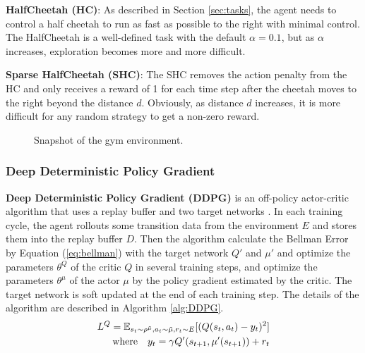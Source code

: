 \textbf{HalfCheetah (HC)}: As described in Section \ref{sec:tasks}, the agent needs to control a half cheetah to run as fast as possible to the right with minimal control. The HalfCheetah is a well-defined task with the default $\alpha = 0.1$, but as $\alpha$ increases, exploration becomes more and more difficult.

\textbf{Sparse HalfCheetah (SHC)}: The SHC removes the action penalty from the HC and only receives a reward of 1 for each time step after the cheetah moves to the right beyond the distance $d$. Obviously, as distance $d$ increases, it is more difficult for any random strategy to get a non-zero reward.

\begin{figure}[htb]
   \centering  
   \caption{Snapshot of the gym environment.}
   \label{fig:MC}
\end{figure}

\subsubsection{Deep Deterministic Policy Gradient}
\textbf{Deep Deterministic Policy Gradient (DDPG)} is an off-policy actor-critic algorithm that uses a replay buffer and two target networks \cite{DDPG}. In each training cycle, the agent rollouts some transition data from the environment $E$ and stores them into the replay buffer $D$. Then the algorithm calculate the Bellman Error by Equation (\ref{eq:bellman}) with the target network $Q'$ and $\mu'$ and optimize the parameters $\theta^{Q}$ of the critic $Q$ in several training steps, and optimize the parameters $\theta^{\mu}$ of the actor $\mu$ by the policy gradient estimated by the critic. The target network is soft updated at the end of each training step. The details of the algorithm are described in Algorithm \ref{alg:DDPG}.
\begin{equation}
   \label{eq:bellman} 
   \begin{aligned}
   L^Q=\mathbb{E}_{s_t\sim\rho^{\tilde\mu},a_t\sim\tilde\mu,r_t\sim E}[(Q(s_t,a_t)-y_t)^2]\\
   \text{where\quad}  y_t = \gamma Q'(s_{t+1},\mu'(s_{t+1}))+r_t
   \end{aligned}
\end{equation}

